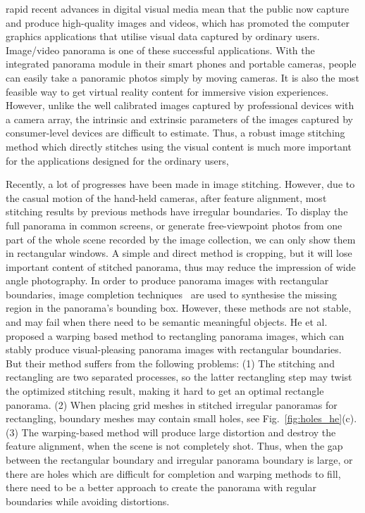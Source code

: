 \documentclass[10pt,journal,compsoc]{IEEEtran}
\begin{document}
 rapid recent advances in digital visual media mean that the public now capture and produce high-quality images and videos, which has promoted the computer graphics applications that utilise visual data captured by ordinary users. Image/video panorama  is one of these successful applications. With the integrated panorama module in their smart phones and portable cameras, people can easily take a panoramic photos simply by moving cameras. It is also the most feasible way to get virtual reality content for immersive vision experiences. However, unlike the well calibrated images captured by professional devices with a camera array, the intrinsic and extrinsic parameters of the images captured by consumer-level devices are difficult to estimate. Thus, a robust image stitching method which directly stitches using the visual content is much more important for the applications designed for the ordinary users,

Recently, a lot of progresses have been made in image stitching. However, due to the casual motion of the hand-held cameras, after feature alignment, most stitching results by previous methods have irregular boundaries. To display the full panorama in common screens, or generate free-viewpoint photos from one part of the whole scene recorded by the image collection, we can only show them in rectangular windows. A simple and direct method is cropping, but it will lose important content of stitched panorama, thus may reduce the impression of wide angle photography. In order to produce panorama images with rectangular boundaries, image completion techniques~\cite{journals/mta/YenYC17, journals/tog/BarnesSFG09} are used to synthesise the missing region in the panorama's bounding box. However, these methods are not stable, and may fail when there need to be semantic meaningful objects. He et al.~\cite{journals/tog/HeC013} proposed a warping based method to rectangling panorama images, which can stably produce visual-pleasing panorama images with rectangular boundaries. But their method suffers from the following problems:
(1) The stitching and rectangling are two separated processes, so the latter rectangling step may twist the optimized stitching result, making it hard to get an optimal rectangle panorama.
(2) When placing grid meshes in stitched irregular panoramas for rectangling, boundary meshes may contain small holes, see Fig.~\ref{fig:holes_he}(c).
(3) The warping-based method will produce large distortion and destroy the feature alignment, when the scene is not completely shot.
Thus, when the gap between the rectangular boundary and irregular panorama boundary is large, or there are holes which are difficult for completion and warping methods to fill, there need to be a better approach to create the panorama with regular boundaries while avoiding distortions.
\end{document}
